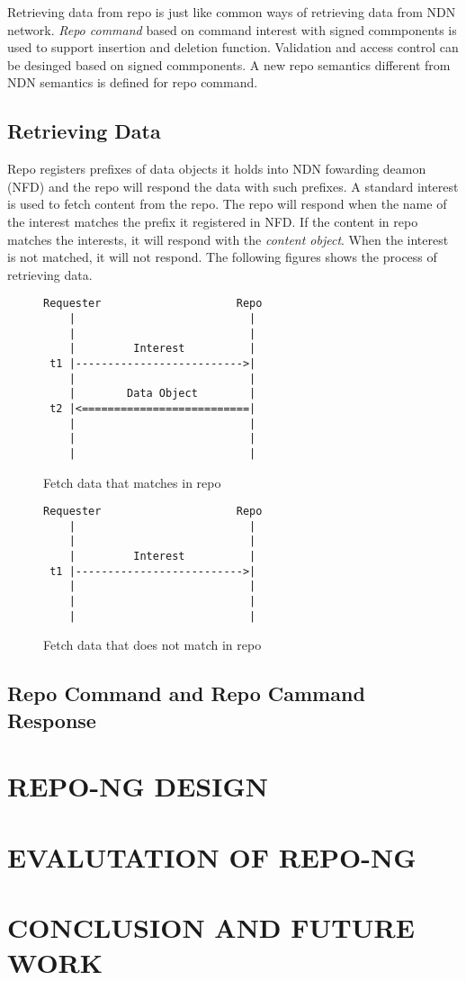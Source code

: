 \documentclass{acm_proc_article-sp}
\begin{document}
Retrieving data from repo is just like common ways of retrieving data from NDN network. \emph{Repo command} based on command interest with signed commponents is used to support insertion and deletion function. Validation and access control can be desinged based on signed commponents. A new repo semantics different from NDN semantics is defined for repo command.

\subsection{Retrieving Data}
Repo registers prefixes of data objects it holds into NDN fowarding deamon (NFD) and the repo will respond the data with such prefixes. A standard interest is used to fetch content from the repo. The repo will respond when the name of the interest matches the prefix it registered in NFD. If the content in repo matches the interests, it will respond with the \emph{content object}. When the interest is not matched, it will not respond. The following figures shows the process of retrieving data.

\begin{figure}
\centering
\begin{BVerbatim}
Requester                     Repo
    |                           |
    |                           |
    |         Interest          |
 t1 |-------------------------->|
    |                           |
    |        Data Object        |
 t2 |<==========================|
    |                           |
    |                           |
    |                           |
\end{BVerbatim}
\caption{Fetch data that matches in repo}
\end{figure}

\begin{figure}
\centering
\begin{BVerbatim}
Requester                     Repo
    |                           |
    |                           |
    |         Interest          |
 t1 |-------------------------->|
    |                           |
    |                           |
    |                           |
\end{BVerbatim}
\caption{Fetch data that does not match in repo}
\end{figure}

\subsection{Repo Command and Repo Cammand Response}

\section{REPO-NG DESIGN}

\section{EVALUTATION OF REPO-NG}

\section{CONCLUSION AND FUTURE WORK}



\end{document}
